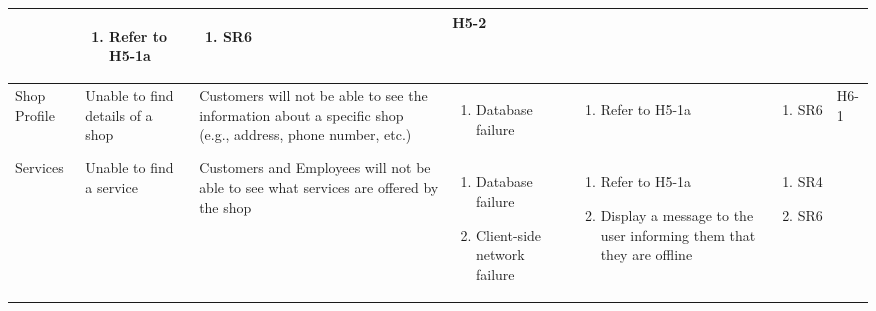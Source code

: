 \documentclass{article}
\begin{document}
\begin{landscape}
\begin{longtable}{|p{}|p{}|p{}|p{}|p{}|p{}|p{}|}
\begin{enumerate}[label=\alph*., leftmargin=*]
		   \end{enumerate}
		 & \begin{enumerate}[label=\alph*., leftmargin=*]
			   \item Refer to H5-1a
		   \end{enumerate}
		 & \begin{enumerate}[label=\alph*., leftmargin=*]
			   \item SR6
		   \end{enumerate}
		 & H5-2                                                                                                         \\
		\hline
		Shop Profile
		 & Unable to find details of a shop
		 & Customers will not be able to see the information about a specific shop (e.g., address, phone number, etc.)
		 & \begin{enumerate}[label=\alph*., leftmargin=*]
			   \item Database failure
		   \end{enumerate}
		 & \begin{enumerate}[label=\alph*., leftmargin=*]
			   \item Refer to H5-1a
		   \end{enumerate}
		 & \begin{enumerate}[label=\alph*., leftmargin=*]
			   \item SR6
		   \end{enumerate}
		 & H6-1                                                                                                         \\
		\hline
		\multirow{2}{*}{Services}
		 & Unable to find a service
		 & Customers and Employees will not be able to see what services are offered by the shop
		 & \begin{enumerate}[label=\alph*., leftmargin=*]
			   \item Database failure
			   \item Client-side network failure
		   \end{enumerate}
		 & \begin{enumerate}[label=\alph*., leftmargin=*]
			   \item Refer to H5-1a
			   \item Display a message to the user informing them that they are offline
		   \end{enumerate}
		 & \begin{enumerate}[label=\alph*., leftmargin=*]
			   \item SR4
			   \item SR6

\end{enumerate}
\end{longtable}
\end{landscape}
\end{document}
